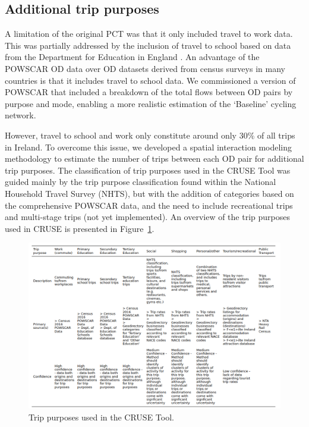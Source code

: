 \documentclass[
  super,
  preprint,
  3p]{elsarticle}
\begin{document}
\hypertarget{sec-trip-purposes}{%
\subsection{Additional trip purposes}\label{sec-trip-purposes}}

A limitation of the original PCT was that it only included travel to
work data. This was partially addressed by the inclusion of travel to
school based on data from the Department for Education in England
\citep{goodman2019}. An advantage of the POWSCAR OD data over OD
datasets derived from census surveys in many countries is that it
includes travel to school data. We commissioned a version of POWSCAR
that included a breakdown of the total flows between OD pairs by purpose
and mode, enabling a more realistic estimation of the `Baseline' cycling
network.

However, travel to school and work only constitute around only 30\% of
all trips in Ireland. To overcome this issue, we developed a spatial
interaction modeling methodology to estimate the number of trips between
each OD pair for additional trip purposes. The classification of trip
purposes used in the CRUSE Tool was guided mainly by the trip purpose
classification found within the National Household Travel Survey (NHTS),
but with the addition of categories based on the comprehensive POWSCAR
data, and the need to include recreational trips and multi-stage trips
(not yet implemented). An overview of the trip purposes used in CRUSE is
presented in Figure~\ref{fig-trip-purposes}.

\begin{figure}

{\centering 

\includegraphics{images/paste-4.png}

}

\caption{\label{fig-trip-purposes}Trip purposes used in the CRUSE Tool.}

\end{figure}
\end{document}

